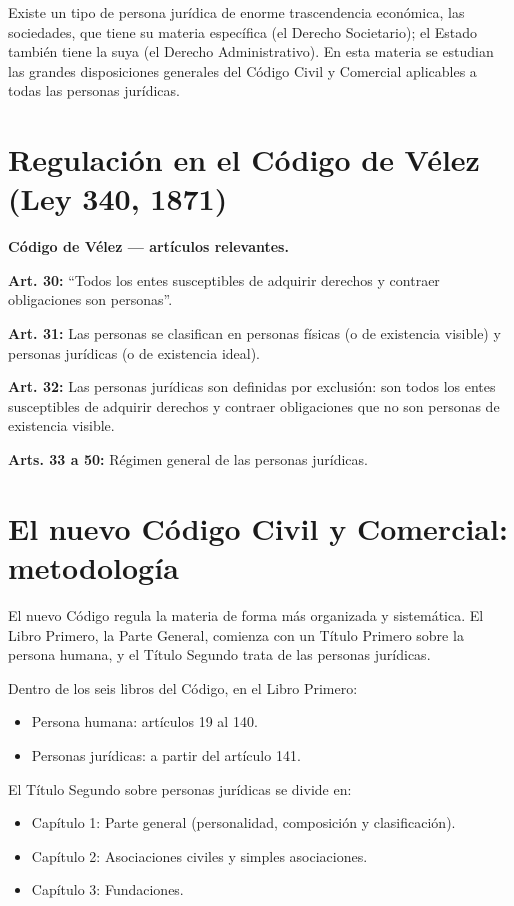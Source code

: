 \documentclass[12pt,oneside]{book}
\begin{document}
\begin{note}
Existe un tipo de persona jurídica de enorme trascendencia económica, las sociedades, que tiene su materia específica (el Derecho Societario); el Estado también tiene la suya (el Derecho Administrativo). En esta materia se estudian las grandes disposiciones generales del Código Civil y Comercial aplicables a todas las personas jurídicas.
\end{note}

\section{Regulación en el Código de Vélez (Ley 340, 1871)}

\begin{note}
\textbf{Código de Vélez --- artículos relevantes.}

\textbf{Art. 30:} ``Todos los entes susceptibles de adquirir derechos y contraer obligaciones son personas''.

\textbf{Art. 31:} Las personas se clasifican en personas físicas (o de existencia visible) y personas jurídicas (o de existencia ideal).

\textbf{Art. 32:} Las personas jurídicas son definidas por exclusión: son todos los entes susceptibles de adquirir derechos y contraer obligaciones que no son personas de existencia visible.

\textbf{Arts. 33 a 50:} Régimen general de las personas jurídicas.
\end{note}

\section{El nuevo Código Civil y Comercial: metodología}

El nuevo Código regula la materia de forma más organizada y sistemática. El Libro Primero, la Parte General, comienza con un Título Primero sobre la persona humana, y el Título Segundo trata de las personas jurídicas.

Dentro de los seis libros del Código, en el Libro Primero:
\begin{itemize}
    \item Persona humana: artículos 19 al 140.
    \item Personas jurídicas: a partir del artículo 141.
\end{itemize}

El Título Segundo sobre personas jurídicas se divide en:
\begin{itemize}
    \item Capítulo 1: Parte general (personalidad, composición y clasificación).
    \item Capítulo 2: Asociaciones civiles y simples asociaciones.
    \item Capítulo 3: Fundaciones.
\end{itemize}
\end{document}
